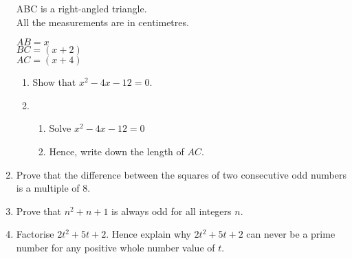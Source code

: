 \begin{enumerate}
\begin{figure}[H]
  \end{figure}
  ABC is a right-angled triangle.\\
  All the measurements are in centimetres.\par
  $AB = x$\\
  $BC = (x + 2)$\\
  $AC = (x + 4)$
  \begin{enumerate}
    \item Show that $x^2 - 4x - 12 = 0$.\strch
    \item \hfill{}
    \begin{enumerate}
      \item Solve $x^2 - 4x - 12 = 0$\strch
      \item Hence, write down the length of $AC$.\strch
    \end{enumerate}
  \end{enumerate}
  \item Prove that the difference between the squares of two consecutive odd numbers is a multiple of $8$.\strch
  \newpage
  \item Prove that $n^2 + n + 1$ is always odd for all integers $n$.\strch
  \item Factorise $2t^2 + 5t + 2$. Hence explain why $2t^2 + 5t + 2$ can never be a prime number for any positive whole number value of $t$.\strch
\end{enumerate}